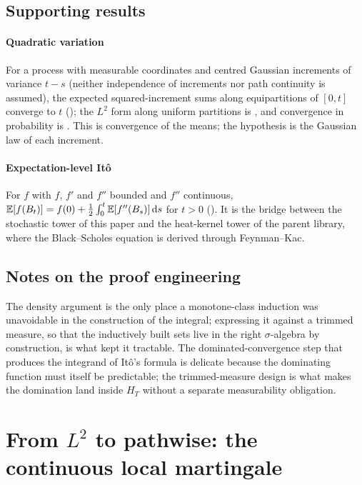 \documentclass[11pt]{article}
\newcommand{\HT}{H_T}
\begin{document}
\subsection{Supporting results}
\paragraph{Quadratic variation}
For a process with measurable coordinates and centred Gaussian increments of variance $t-s$ (neither
independence of increments nor path continuity is assumed), the expected squared-increment sums along
equipartitions of $[0,t]$ converge to $t$ (); the $L^2$ form along uniform partitions is
, and convergence in probability is . This is convergence of the means; the hypothesis is the Gaussian law of each increment.

\paragraph{Expectation-level It\^o}
For $f$ with $f$, $f'$ and $f''$ bounded and $f''$ continuous,
$\mathbb{E}[f(B_t)]=f(0)+\frac12\int_0^t\mathbb{E}[f''(B_s)]\,\mathrm{d} s$ for $t>0$ (). It is the bridge between the stochastic tower of this paper and the heat-kernel
tower of the parent library, where the Black--Scholes equation is derived through Feynman--Kac.

\subsection{Notes on the proof engineering}
The density argument is the only place a monotone-class induction was unavoidable in the construction of the
integral; expressing it against a trimmed measure, so that the inductively built sets live in the right
$\sigma$-algebra by construction, is what kept it tractable. The dominated-convergence step that produces the
integrand of It\^o's formula is delicate because the dominating function must itself be predictable; the
trimmed-measure design is what makes the domination land inside $\HT$ without a separate measurability
obligation.

\section{From \texorpdfstring{$L^2$}{L2} to pathwise: the continuous local martingale}\label{sec:pathwise}
\end{document}
